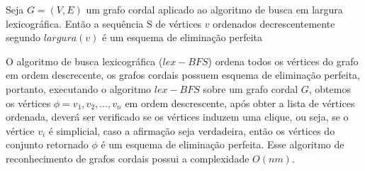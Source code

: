 \begin{lemma}
Seja $G = (V, E)$ um grafo cordal aplicado ao algoritmo de busca em largura lexicográfica. Então a sequência S de vértices $v$ ordenados decrescentemente segundo $largura(v)$ é um esquema de eliminação perfeita
\end{lemma}


O algoritmo de busca lexicográfica ($lex-BFS$) ordena todos os vértices do grafo em ordem descrecente, os grafos cordais possuem esquema de eliminação perfeita, portanto, executando o algoritmo $lex-BFS$ sobre um grafo cordal $G$, obtemos os vértices $\phi = v_1, v_2, ..., v_n$ em ordem descrescente, após obter a lista de vértices ordenada, deverá ser verificado se os vértices induzem uma clique, ou seja, se o vértice $v_i$ é simplicial, caso a afirmação seja verdadeira, então os vértices do conjunto retornado $\phi$ é um esquema de eliminação perfeita. Esse algoritmo de reconhecimento de grafos cordais possui a complexidade $O(nm)$.
